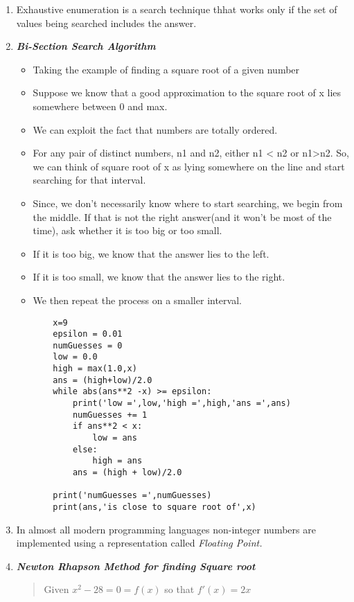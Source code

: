 \documentclass[11pt]{article}
\begin{document}
\begin{enumerate}
        \item Exhaustive enumeration is a search technique thhat works only if the set of values being searched includes the answer.
        \item \textbf{ \textit{Bi-Section Search Algorithm}}
            \begin{itemize}
                \item Taking the example of finding a square root of a given number
                \item Suppose we know that a good approximation to the square root of x lies somewhere between 0 and max.
                \item We can exploit the fact that numbers are totally ordered.
                \item For any pair of distinct numbers, n1 and n2, either n1 < n2 or n1>n2. So, we can think of square root of x as lying somewhere on the line and start searching for that interval.
                \item Since, we don't necessarily know where to start searching, we begin from the middle. If that is not the right answer(and it won't be most of the time), ask whether it is too big or too small. 
                \item If it is too big, we know that the answer lies to the left.
                \item If it is too small, we know that the answer lies to the right.
                \item We then repeat the process on a smaller interval.
\begin{verbatim}
    x=9
    epsilon = 0.01
    numGuesses = 0
    low = 0.0
    high = max(1.0,x)
    ans = (high+low)/2.0
    while abs(ans**2 -x) >= epsilon:
        print('low =',low,'high =',high,'ans =',ans)
        numGuesses += 1
        if ans**2 < x:
            low = ans
        else:
            high = ans
        ans = (high + low)/2.0

    print('numGuesses =',numGuesses)
    print(ans,'is close to square root of',x)
\end{verbatim}
            \end{itemize}
            \item In almost all modern programming languages non-integer numbers are implemented using a representation called \textit{Floating Point.}
            \item \textbf{ \textit{Newton Rhapson Method for finding Square root}}
            \begin{quote}
                Given \(x^2-28=0=f(x)\) so that \(f'(x)=2x\)
            \end{quote}
    \end{enumerate}
\end{document}
